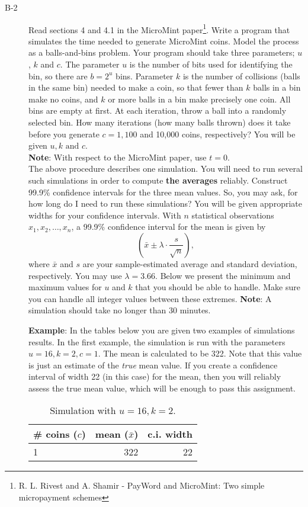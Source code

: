 \documentclass{article}
\begin{document}
\begin{description}
		\item[B-2]{Read sections 4 and 4.1 in the MicroMint paper\footnote{R. L. Rivest and A. Shamir - PayWord and MicroMint: Two simple micropayment schemes}.
			Write a program that simulates the time needed to generate MicroMint coins.
			Model the process as a balls-and-bins problem.
			Your program should take three parameters; $u$, $k$ and $c$.
			The parameter $u$ is the number of bits used for identifying the bin, so there are $b=2^u$ bins.
			Parameter $k$ is the number of collisions (balls in the same bin) needed to make a coin, so that fewer than $k$ balls in a bin make no coins, 
			and $k$ or more balls in a bin make precisely one coin.
			All bins are empty at first.
			At each iteration, throw a ball into a randomly selected bin.
			How many iterations (how many balls thrown) does it take before you generate $c = 1, 100$ and 10,000 coins, respectively?
			You will be given $u, k \textrm{ and } c$.\\
			\textbf{Note}: With respect to the MicroMint paper, use $t=0$.\\
			The above procedure describes one simulation.
			You will need to run several such simulations in order to compute \textbf{the averages} reliably.
			Construct 99.9\% confidence intervals for the three mean values.
			So, you may ask, for how long do I need to run these simulations?
			You will be given appropriate widths for your confidence intervals.
			With $n$ statistical observations $x_1, x_2,\ldots, x_n$, a 99.9\% confidence interval for the mean is given by
			\[\left(\bar{x}\pm\lambda\cdot\frac{s}{\sqrt{n}}\right),\]
			where $\bar{x}$ and $s$ are your sample-estimated average and standard deviation, respectively.
			You may use $\lambda=3.66$.
			Below we present the minimum and maximum values for $u$ and $k$
			that you should be able to handle. Make sure you can handle all integer values between these extremes. \textbf{Note}: A simulation should take no longer than 30 minutes.
			
			\textbf{Example}: In the tables below you are given two examples of simulations results. 
			In the first example,
			the simulation is run with the parameters $u = 16, k = 2, c = 1$. The mean is calculated to be 322.
			Note that this value is just an estimate of the \textit{true} mean value. 
			If you create a confidence interval of width 22 (in this case) for the mean, 
			then you will reliably assess the true mean value, which will be enough to pass this assignment.
			
			\begin{table}[h]
				\centering
				\caption{Simulation with $u = 16, k = 2$.}
				\begin{tabular}{lrr}
					\toprule
					\# coins ($c$) & mean ($\bar{x}$) & c.i. width \\
					\midrule
					1      &        322 &       22 \\
					

\end{tabular}
\end{table}}
\end{description}
\end{document}
